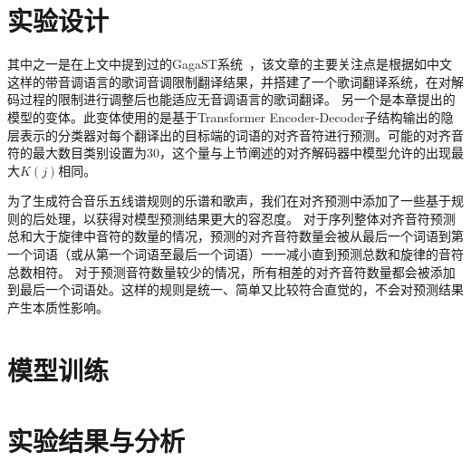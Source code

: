 \section{实验设计}

其中之一是在上文中提到过的GagaST系统~\cite{gagast}，该文章的主要关注点是根据如中文这样的带音调语言的歌词音调限制翻译结果，并搭建了一个歌词翻译系统，在对解码过程的限制进行调整后也能适应无音调语言的歌词翻译。
另一个是本章提出的模型的变体。此变体使用的是基于Transformer Encoder-Decoder子结构输出的隐层表示的分类器对每个翻译出的目标端的词语的对齐音符进行预测。可能的对齐音符的最大数目类别设置为30，这个量与上节阐述的对齐解码器中模型允许的出现最大$K(j)$相同。

为了生成符合音乐五线谱规则的乐谱和歌声，我们在对齐预测中添加了一些基于规则的后处理，以获得对模型预测结果更大的容忍度。
对于序列整体对齐音符预测总和大于旋律中音符的数量的情况，预测的对齐音符数量会被从最后一个词语到第一个词语（或从第一个词语至最后一个词语）一一减小直到预测总数和旋律的音符总数相符。
对于预测音符数量较少的情况，所有相差的对齐音符数量都会被添加到最后一个词语处。这样的规则是统一、简单又比较符合直觉的，不会对预测结果产生本质性影响。
\section{模型训练}
\section{实验结果与分析}
